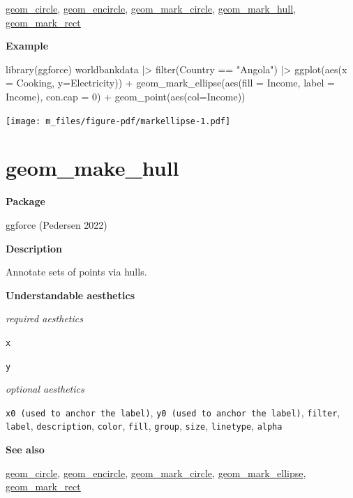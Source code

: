 \documentclass[
  letterpaper,
  DIV=11,
  numbers=noendperiod]{scrreprt}
\newenvironment{Shaded}{\begin{snugshade}}{\end{snugshade}}
\newcommand{\AttributeTok}[1]{\textcolor[rgb]{0.40,0.45,0.13}{#1}}
\newcommand{\DecValTok}[1]{\textcolor[rgb]{0.68,0.00,0.00}{#1}}
\newcommand{\FunctionTok}[1]{\textcolor[rgb]{0.28,0.35,0.67}{#1}}
\newcommand{\NormalTok}[1]{\textcolor[rgb]{0.00,0.23,0.31}{#1}}
\newcommand{\SpecialCharTok}[1]{\textcolor[rgb]{0.37,0.37,0.37}{#1}}
\newcommand{\StringTok}[1]{\textcolor[rgb]{0.13,0.47,0.30}{#1}}
\begin{document}
\hyperref[circle]{geom\_circle}, \hyperref[encircle]{geom\_encircle},
\hyperref[mark_circle]{geom\_mark\_circle},
\hyperref[mark_hill]{geom\_mark\_hull},
\hyperref[mark_rect]{geom\_mark\_rect}

\textbf{Example}

\begin{Shaded}
\begin{Highlighting}[]
\FunctionTok{library}\NormalTok{(ggforce)}
\NormalTok{worldbankdata }\SpecialCharTok{|\textgreater{}}
  \FunctionTok{filter}\NormalTok{(Country }\SpecialCharTok{==} \StringTok{"Angola"}\NormalTok{) }\SpecialCharTok{|\textgreater{}}
  \FunctionTok{ggplot}\NormalTok{(}\FunctionTok{aes}\NormalTok{(}\AttributeTok{x =}\NormalTok{ Cooking, }\AttributeTok{y=}\NormalTok{Electricity)) }\SpecialCharTok{+}
  \FunctionTok{geom\_mark\_ellipse}\NormalTok{(}\FunctionTok{aes}\NormalTok{(}\AttributeTok{fill =}\NormalTok{ Income, }\AttributeTok{label =}\NormalTok{ Income),}
                   \AttributeTok{con.cap =} \DecValTok{0}\NormalTok{) }\SpecialCharTok{+}
  \FunctionTok{geom\_point}\NormalTok{(}\FunctionTok{aes}\NormalTok{(}\AttributeTok{col=}\NormalTok{Income))}
\end{Highlighting}
\end{Shaded}

\texttt{[image: m\_files/figure-pdf/markellipse-1.pdf]}

\section{geom\_make\_hull}\label{mark_hull}

\textbf{Package}

ggforce (Pedersen 2022)

\textbf{Description}

Annotate sets of points via hulls.

\textbf{Understandable aesthetics}

\emph{required aesthetics}

\texttt{x}

\texttt{y}

\emph{optional aesthetics}

\texttt{x0\ (used\ to\ anchor\ the\ label)},
\texttt{y0\ (used\ to\ anchor\ the\ label)}, \texttt{filter},
\texttt{label}, \texttt{description}, \texttt{color}, \texttt{fill},
\texttt{group}, \texttt{size}, \texttt{linetype}, \texttt{alpha}

\textbf{See also}

\hyperref[circle]{geom\_circle}, \hyperref[encircle]{geom\_encircle},
\hyperref[mark_circle]{geom\_mark\_circle},
\hyperref[mark_ellipse]{geom\_mark\_ellipse},
\hyperref[mark_rect]{geom\_mark\_rect}
\end{document}
